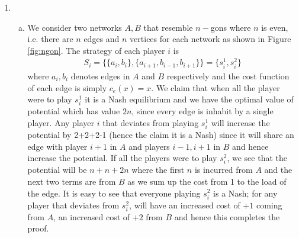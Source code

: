 \documentclass[a4paper,12pt]{article}
\theoremstyle{definition}
\begin{document}
\begin{enumerate}
\begin{enumerate}[(a)]
\item 

\item


\end{enumerate}


\item
\begin{enumerate}[(a)]
\item We consider two networks $A, B$ that resemble $n-$gons where $n$ is even, i.e. there are $n$ edges and $n$ vertices for each network as shown in Figure \ref{fig:ngon}. The strategy of each player $i$ is 
\begin{align*}
S_i=\{\{a_i,b_i\},\{a_{i+1},b_{i-1},b_{i+1}\}\}=\{s_i^1,s_i^2\}
\end{align*}
where $a_i,b_i$ denotes edges in $A$ and $B$ respectively and the cost function of each edge is simply $c_e(x)=x$. We claim that when all the player were to play $s_i^1$ it is a Nash equilibrium and we have the optimal value of potential which has value $2n$, since every edge is inhabit by a single player. Any player $i$ that deviates from playing $s_i^1$ will increase the potential by 2+2+2-1 (hence the claim it is a Nash) since it will share an edge with player $i+1$ in $A$ and players $i-1, i+1$ in $B$ and hence increase the potential. If all the players were to play $s_i^2$, we see that the potential will be $n+n+2n$ where the first $n$ is incurred from $A$ and the next two terms are from $B$ as we sum up the cost from 1 to the load of the edge. It is easy to see that everyone playing $s_i^2$ is a Nash; for any player that deviates from $s_i^2$, will have an increased cost of $+1$ coming from $A$, an increased cost of $+2$ from $B$ and hence this completes the proof. 



\newdimen\R
\R=2cm
\begin{figure}[h]
\centering
{}
\end{figure}
\end{enumerate}
\end{enumerate}
\end{document}
